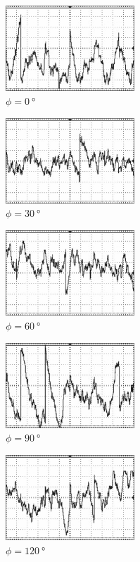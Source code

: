 	\begin{subfigure}{0.3\textwidth}
		\centering
		\includegraphics[height=3.21cm]{content/with_noise/0_with_noise.png}
		\caption{$\phi = \qty{0}{\degree}$}
	\end{subfigure}
	\hfill
	\begin{subfigure}{0.3\textwidth}
		\centering
		\includegraphics[height=3.21cm]{content/with_noise/30_with_noise.png}
		\caption{$\phi = \qty{30}{\degree}$}
	\end{subfigure}
	\hfill
	\begin{subfigure}{0.3\textwidth}
		\centering
		\includegraphics[height=3.21cm]{content/with_noise/60_with_noise.png}
		\caption{$\phi = \qty{60}{\degree}$}
	\end{subfigure}
	\par\bigskip
	\begin{subfigure}{0.3\textwidth}
		\centering
		\includegraphics[height=3.21cm]{content/with_noise/90_with_noise.png}
		\caption{$\phi = \qty{90}{\degree}$}
	\end{subfigure}
	\hfill
	\begin{subfigure}{0.3\textwidth}
		\centering
		\includegraphics[height=3.21cm]{content/with_noise/120_with_noise.png}
		\caption{$\phi = \qty{120}{\degree}$}
	\end{subfigure}
